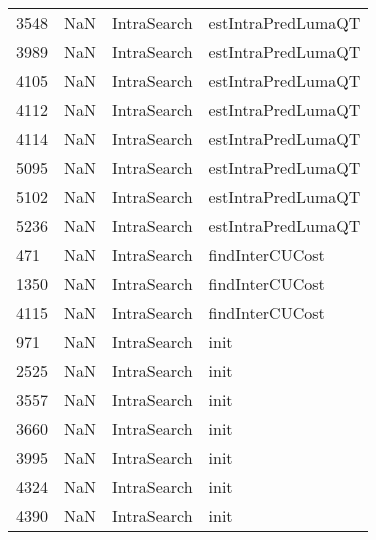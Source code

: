 \begin{tabular}{llll}
3548 &                   NaN &                IntraSearch &                        estIntraPredLumaQT \\
3989 &                   NaN &                IntraSearch &                        estIntraPredLumaQT \\
4105 &                   NaN &                IntraSearch &                        estIntraPredLumaQT \\
4112 &                   NaN &                IntraSearch &                        estIntraPredLumaQT \\
4114 &                   NaN &                IntraSearch &                        estIntraPredLumaQT \\
5095 &                   NaN &                IntraSearch &                        estIntraPredLumaQT \\
5102 &                   NaN &                IntraSearch &                        estIntraPredLumaQT \\
5236 &                   NaN &                IntraSearch &                        estIntraPredLumaQT \\
471  &                   NaN &                IntraSearch &                           findInterCUCost \\
1350 &                   NaN &                IntraSearch &                           findInterCUCost \\
4115 &                   NaN &                IntraSearch &                           findInterCUCost \\
971  &                   NaN &                IntraSearch &                                      init \\
2525 &                   NaN &                IntraSearch &                                      init \\
3557 &                   NaN &                IntraSearch &                                      init \\
3660 &                   NaN &                IntraSearch &                                      init \\
3995 &                   NaN &                IntraSearch &                                      init \\
4324 &                   NaN &                IntraSearch &                                      init \\
4390 &                   NaN &                IntraSearch &                                      init \\

\end{tabular}
